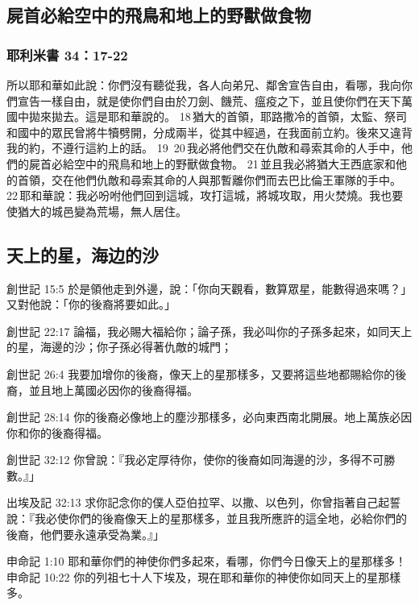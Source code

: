 \subsection{屍首必給空中的飛鳥和地上的野獸做食物}
\subsubsection{耶利米書 34：17-22}
所以耶和華如此說：你們沒有聽從我，各人向弟兄、鄰舍宣告自由，看哪，我向你們宣告一樣自由，就是使你們自由於刀劍、饑荒、瘟疫之下，並且使你們在天下萬國中拋來拋去。這是耶和華說的。 18 猶大的首領，耶路撒冷的首領，太監、祭司和國中的眾民曾將牛犢劈開，分成兩半，從其中經過，在我面前立約。後來又違背我的約，不遵行這約上的話。 19  20 我必將他們交在仇敵和尋索其命的人手中，他們的屍首必給空中的飛鳥和地上的野獸做食物。 21 並且我必將猶大王西底家和他的首領，交在他們仇敵和尋索其命的人與那暫離你們而去巴比倫王軍隊的手中。 22 耶和華說：我必吩咐他們回到這城，攻打這城，將城攻取，用火焚燒。我也要使猶大的城邑變為荒場，無人居住。













  

\subsection{天上的星，海边的沙}

創世記 15:5
於是領他走到外邊，說：「你向天觀看，數算眾星，能數得過來嗎？」又對他說：「你的後裔將要如此。」

創世記 22:17 論福，我必賜大福給你；論子孫，我必叫你的子孫多起來，如同天上的星，海邊的沙；你子孫必得著仇敵的城門；

創世記 26:4
我要加增你的後裔，像天上的星那樣多，又要將這些地都賜給你的後裔，並且地上萬國必因你的後裔得福。

創世記 28:14
你的後裔必像地上的塵沙那樣多，必向東西南北開展。地上萬族必因你和你的後裔得福。

創世記 32:12
你曾說：『我必定厚待你，使你的後裔如同海邊的沙，多得不可勝數。』」

出埃及記 32:13
求你記念你的僕人亞伯拉罕、以撒、以色列，你曾指著自己起誓說：『我必使你們的後裔像天上的星那樣多，並且我所應許的這全地，必給你們的後裔，他們要永遠承受為業。』」

申命記 1:10
耶和華你們的神使你們多起來，看哪，你們今日像天上的星那樣多！
申命記 10:22
你的列祖七十人下埃及，現在耶和華你的神使你如同天上的星那樣多。

